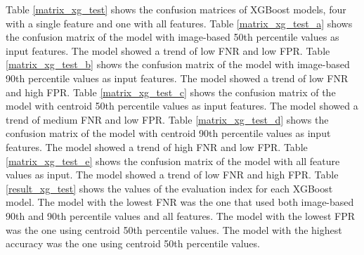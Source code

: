﻿Table \ref{matrix_xg_test} shows the confusion matrices of XGBoost models, four with a single feature and one with all features. 
% 
Table \ref{matrix_xg_test_a} shows the confusion matrix of the model with image-based 50th percentile values as input features. 
% 
The model showed a trend of low FNR and low FPR.
% 
Table \ref{matrix_xg_test_b} shows the confusion matrix of the model with image-based 90th percentile values as input features. 
% 
The model showed a trend of low FNR and high FPR.
%
Table \ref{matrix_xg_test_c} shows the confusion matrix of the model with centroid 50th percentile values as input features. 
% 
The model showed a trend of medium FNR and low FPR. 
%
Table \ref{matrix_xg_test_d} shows the confusion matrix of the model with centroid 90th percentile values as input features. 
% 
The model showed a trend of high FNR and low FPR.
% 
Table \ref{matrix_xg_test_e} shows the confusion matrix of the model with all feature values as input. 
% 
The model showed a trend of low FNR and high FPR.
% 
Table \ref{result_xg_test} shows the values of the evaluation index for each XGBoost model.
% 
The model with the lowest FNR was the one that used both image-based 90th and 90th percentile values and all features.
%
The model with the lowest FPR was the one using centroid 50th percentile values.
% 
The model with the highest accuracy was the one using centroid 50th percentile values.
